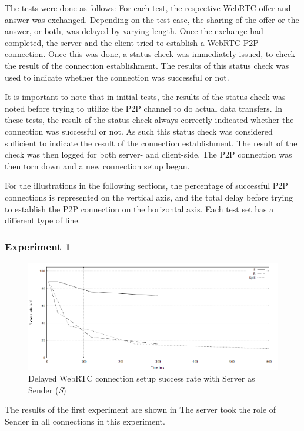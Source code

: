 The tests were done as follows:
For each test, the respective WebRTC offer and answer was exchanged. Depending on the test case, the sharing of the offer or the answer, or both, was delayed by varying length. Once the exchange had completed, the server and the client tried to establish a WebRTC P2P connection. Once this was done, a status check was immediately issued, to check the result of the connection establishment. The results of this status check was used to indicate whether the connection was successful or not.

It is important to note that in initial tests, the results of the status check was noted before trying to utilize the P2P channel to do actual data transfers. In these tests, the result of the status check always correctly indicated whether the connection was successful or not. As such this status check was considered sufficient to indicate the result of the connection establishment. The result of the check was then logged for both server- and client-side. The P2P connection was then torn down and a new connection setup began.
%

For the illustrations in the following sections, the percentage of successful P2P connections is represented on the vertical axis, and the total delay before trying to establish the P2P connection on the horizontal axis. Each test set has a different type of line. 
%
%
\subsubsection*{Experiment 1}
%
\begin{figure}[th]
  \centering
  \includegraphics[width=\textwidth]{Figures/Exp1_res}
  \decoRule
  \caption[Experiment 1]{Delayed WebRTC connection setup success rate with Server as Sender (\textit{S})}
  \label{fig:exp1}
\end{figure}
%
The results of the first experiment are shown in  The server took the role of Sender in all connections in this experiment.

